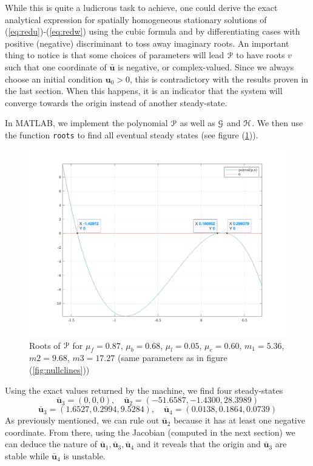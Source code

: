 While this is quite a ludicrous task to achieve, one could derive the exact analytical expression for spatially homogeneous stationary solutions of (\ref{eq:redu})-(\ref{eq:redw}) using the cubic formula and by differentiating cases with positive (negative) discriminant to toss away imaginary roots. An important thing to notice is that some choices of parameters will lead $\EuScript{P}$ to have roots $v$ such that one coordinate of $\bar{\bm u}$ is negative, or complex-valued. Since we always choose an initial condition $\bm u_0 > 0$, this is contradictory with the results proven in the last section. When this happens, it is an indicator that the system will converge towards the origin instead of another steady-state. 

\begin{example}
	In MATLAB, we implement the polynomial $\EuScript{P}$ as well as $\EuScript{G}$ and $\EuScript{H}$. We then use the function \texttt{roots} to find all eventual steady states (see figure (\ref{fig:matlabP})).
	\begin{figure}
		\label{fig:matlabP}
		\includegraphics[width=0.6\linewidth]{figures/polyP_v.png}
		\caption{Roots of $\EuScript{P}$ for $\mu_f = 0.87$, $\mu_b = 0.68$, $\mu_l = 0.05$, $\mu_e = 0.60$, $m_1 = 5.36$, $m2 = 9.68$, $m3 = 17.27$ (same parameters as in figure (\ref{fig:nullclines})) }
	\end{figure}
	Using the exact values returned by the machine, we find four steady-states 
	$$\bar{\bm u}_{3} = (0, 0, 0), \quad \bar{\bm u}_{2} = (-51.6587, -1.4300, 28.3989) $$
	$$\bar{\bm u}_{3} = (1.6527, 0.2994, 9.5284), \quad \bar{\bm u}_{4} = (0.0138, 0.1864, 0.0739)$$
	As previously mentioned, we can rule out $\bar{\bm u}_2$ because it has at least one negative coordinate. From there, using the Jacobian (computed in the next section) we can deduce the nature of $\bar{\bm u}_1, \bar{\bm u}_3, \bar{\bm u}_4$ and it reveals that the origin and $\bar{\bm u}_3$ are stable while $\bar{\bm u}_4$ is unstable.
\end{example}
	
